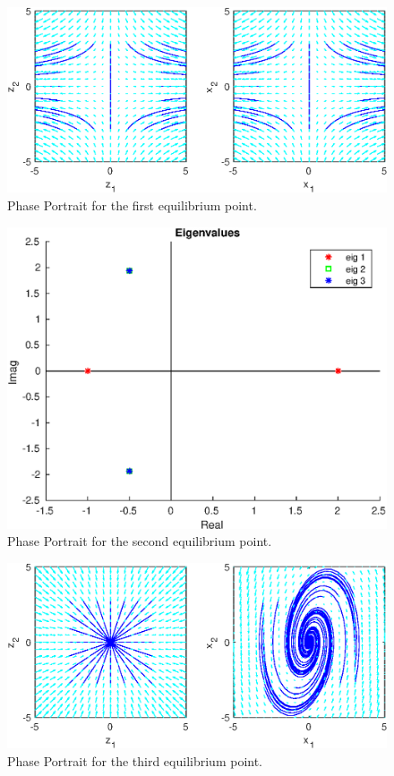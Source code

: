 \documentclass[a4paper,10pt]{article}
\begin{document}
\begin{figure}[H]
  \centering
  \includegraphics[width=.8\linewidth]{question3a.eps}
  \caption{Phase Portrait for the first equilibrium point.} \label{fig:q3a}
\end{figure}

\begin{figure}[H]
  \centering
  \includegraphics[width=.8\linewidth]{question3b.eps}
  \caption{Phase Portrait for the second equilibrium point.} \label{fig:q3b}
\end{figure}

\begin{figure}[H]
  \centering
  \includegraphics[width=.8\linewidth]{question3c.eps}
  \caption{Phase Portrait for the third equilibrium point.} \label{fig:q3c}
\end{figure}
\end{document}
